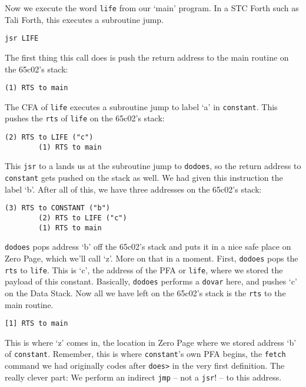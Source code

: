 Now we execute the word \texttt{life} from our `main' program. In a STC Forth
such as Tali Forth, this executes a subroutine jump.

\begin{lstlisting}[frame=lines]
        jsr LIFE
\end{lstlisting}

\noindent The first thing this call does is push the return address to the main routine
on the 65c02's stack: 

\begin{lstlisting}[frame=lines]
        (1) RTS to main
\end{lstlisting}

\noindent The CFA of \texttt{life} executes a subroutine jump to label `a' in
\texttt{constant}. This pushes the \texttt{rts} of \texttt{life} on the 65c02's
stack:

\begin{lstlisting}[frame=lines]
        (2) RTS to LIFE ("c")
        (1) RTS to main
\end{lstlisting}

\noindent This \texttt{jsr} to a lands us at the subroutine jump to \texttt{dodoes}, so
the return address to \texttt{constant} gets pushed on the stack as well. We had
given this instruction the label `b'. After all of this, we have three addresses
on the 65c02's stack: 

\begin{lstlisting}[frame=lines]
        (3) RTS to CONSTANT ("b") 
        (2) RTS to LIFE ("c") 
        (1) RTS to main
\end{lstlisting}

\noindent \texttt{dodoes} pops address `b' off the 65c02's stack and puts it in a nice
safe place on Zero Page, which we'll call `z'. More on that in a moment. First,
\texttt{dodoes} pops the \texttt{rts} to \texttt{life}. This is `c', the
address of the PFA or \texttt{life}, where we stored the payload of this
constant. Basically, \texttt{dodoes} performs a \texttt{dovar} here, and
pushes `c' on the Data Stack. Now all we have left on the 65c02's stack is the
\texttt{rts} to the main routine.  
 
\begin{lstlisting}[frame=lines]
        [1] RTS to main
\end{lstlisting}

\noindent This is where `z' comes in, the location in Zero Page where we stored address
`b' of \texttt{constant}. Remember, this is where \texttt{constant}'s own PFA
begins, the \texttt{fetch} command we had originally codes after \texttt{does>}
in the very first definition. The really clever part: We perform an indirect
\texttt{jmp} -- not a \texttt{jsr}! -- to this address.

